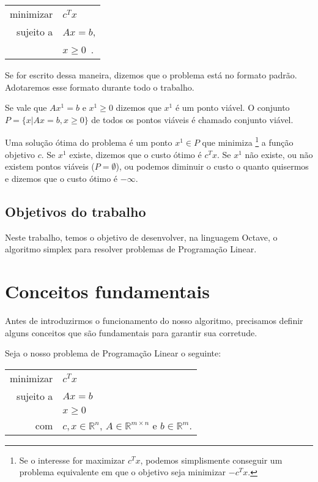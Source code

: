 \documentclass[12pt]{article}
\begin{document}
	\begin{center}
    	\begin{tabular}{r l}
	  		minimizar & $c^Tx$ \\
        
	        sujeito a & $Ax = b$, \\
       				  & $x \geq 0$~\cite{315book}.
        \end{tabular}
    \end{center}
    Se for escrito dessa maneira, dizemos que o problema está no formato padrão. Adotaremos esse formato durante todo o trabalho.
    
    Se vale que $Ax^1 = b$ e $x^1 \geq 0$ dizemos que $x^1$ é um ponto viável. O conjunto $P = \{x| Ax = b, x \geq 0\}$ de todos os pontos viáveis é chamado conjunto viável.
    
    Uma solução ótima do problema é um ponto $x^1 \in P$ que minimiza \footnote[1]{Se o interesse for maximizar ${c}^{T}x$, podemos simplismente conseguir um problema equivalente em que o objetivo seja minimizar $-{c}^{T}x$.} a função objetivo $c$. Se $x^1$ existe, dizemos que o custo ótimo é $c^Tx$. Se $x^1$ não existe, ou não existem pontos viáveis ($P = \emptyset$), ou podemos diminuir o custo o quanto quisermos e dizemos que o custo ótimo é $- \infty$.
    

\subsection{Objetivos do trabalho}
	Neste trabalho, temos o objetivo de desenvolver, na linguagem Octave, o algoritmo simplex para resolver problemas de Programação Linear.


\section{Conceitos fundamentais}
	Antes de introduzirmos o funcionamento do nosso algoritmo, precisamos definir alguns conceitos que são fundamentais para garantir sua corretude.

	Seja o nosso problema de Programação Linear o seguinte:
    \begin{center}
    	\begin{tabular}{r l}
	  		minimizar & $c^Tx$ \\
        
        	sujeito a & $Ax = b$ \\
            & $x \geq 0$ \\
       	
        
        com & $c, x \in \mathbb{R}^n$, $A \in \mathbb{R}^{m \times n}$ e $b \in \mathbb{R}^{m}$.
        \end{tabular}
    \end{center}
\end{document}
